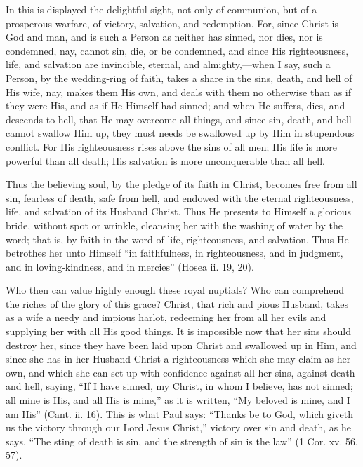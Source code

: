 In this is displayed the delightful sight, not only of communion, but of a
prosperous warfare, of victory, salvation, and redemption. For, since
Christ is God and man, and is such a Person as neither has sinned, nor
dies, nor is condemned, nay, cannot sin, die, or be condemned, and since
His righteousness, life, and salvation are invincible, eternal, and
almighty,—when I say, such a Person, by the wedding-ring of faith,
takes a share in the sins, death, and hell of His wife, nay, makes them
His own, and deals with them no otherwise than as if they were His, and as
if He Himself had sinned; and when He suffers, dies, and descends to hell,
that He may overcome all things, and since sin, death, and hell cannot
swallow Him up, they must needs be swallowed up by Him in stupendous
conflict. For His righteousness rises above the sins of all men; His life
is more powerful than all death; His salvation is more unconquerable than
all hell.

Thus the believing soul, by the pledge of its faith in Christ, becomes
free from all sin, fearless of death, safe from hell, and endowed with the
eternal righteousness, life, and salvation of its Husband Christ. Thus He
presents to Himself a glorious bride, without spot or wrinkle, cleansing
her with the washing of water by the word; that is, by faith in the word
of life, righteousness, and salvation. Thus He betrothes her unto Himself
``in faithfulness, in righteousness, and in judgment, and in
loving-kindness, and in mercies'' (Hosea ii. 19, 20).

Who then can value highly enough these royal nuptials? Who can comprehend
the riches of the glory of this grace? Christ, that rich and pious
Husband, takes as a wife a needy and impious harlot, redeeming her from
all her evils and supplying her with all His good things. It is impossible
now that her sins should destroy her, since they have been laid upon
Christ and swallowed up in Him, and since she has in her Husband Christ a
righteousness which she may claim as her own, and which she can set up
with confidence against all her sins, against death and hell, saying, ``If
I have sinned, my Christ, in whom I believe, has not sinned; all mine is
His, and all His is mine,'' as it is written, ``My beloved is mine, and I am
His'' (Cant. ii. 16). This is what Paul says: ``Thanks be to God, which
giveth us the victory through our Lord Jesus Christ,'' victory over sin and
death, as he says, ``The sting of death is sin, and the strength of sin is
the law'' (1 Cor. xv. 56, 57).

